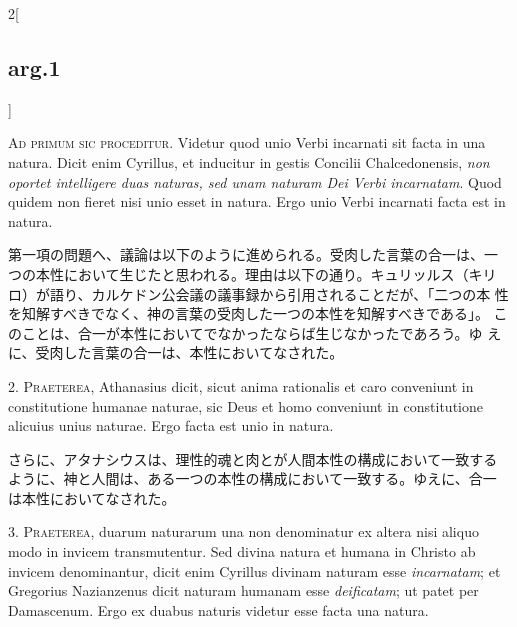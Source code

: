 \documentclass[paper=a4paper,fontsize=10pt,jafontsize=9pt,titlepage]{jlreq}
\begin{document}
\begin{paracol}{2}[\subsection{arg.1}]

{\Huge A}{\scshape d primum sic proceditur}. Videtur quod unio Verbi
incarnati sit facta in una natura. Dicit enim Cyrillus, et inducitur
in gestis Concilii Chalcedonensis, {\itshape non oportet intelligere
duas naturas, sed unam naturam Dei Verbi incarnatam}. Quod quidem non
fieret nisi unio esset in natura. Ergo unio Verbi incarnati facta est
in natura.

\switchcolumn

第一項の問題へ、議論は以下のように進められる。受肉した言葉の合一は、一
つの本性において生じたと思われる。理由は以下の通り。キュリッルス（キリ
ロ）が語り、カルケドン公会議の議事録から引用されることだが、「二つの本
性を知解すべきでなく、神の言葉の受肉した一つの本性を知解すべきである」。
このことは、合一が本性においてでなかったならば生じなかったであろう。ゆ
えに、受肉した言葉の合一は、本性においてなされた。


2. {\scshape Praeterea}, Athanasius dicit, sicut anima rationalis et
caro conveniunt in constitutione humanae naturae, sic Deus et homo
conveniunt in constitutione alicuius unius naturae. Ergo facta est
unio in natura.

\switchcolumn

さらに、アタナシウスは、理性的魂と肉とが人間本性の構成において一致する
ように、神と人間は、ある一つの本性の構成において一致する。ゆえに、合一
は本性においてなされた。


3. {\scshape Praeterea}, duarum naturarum una non denominatur ex
altera nisi aliquo modo in invicem transmutentur. Sed divina natura et
humana in Christo ab invicem denominantur, dicit enim Cyrillus divinam
naturam esse {\itshape incarnatam}; et Gregorius Nazianzenus dicit
naturam humanam esse {\itshape deificatam}; ut patet per
Damascenum. Ergo ex duabus naturis videtur esse facta una natura.


\end{paracol}
\end{document}
